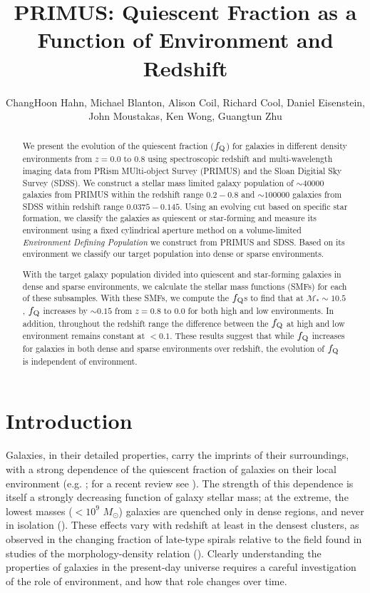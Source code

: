 \documentclass{emulateapj}
\begin{document}
\title{PRIMUS: Quiescent Fraction as a Function of Environment and Redshift}
\author{ChangHoon Hahn, Michael Blanton, Alison Coil, Richard Cool, Daniel Eisenstein, John Moustakas, Ken Wong, Guangtun Zhu}

\begin{abstract}
We present the evolution of the quiescent fraction ($f_{\rm{Q}}$) for galaxies in 
different density environments from $z=0.0$ to $0.8$ using spectroscopic 
redshift and multi-wavelength imaging data from PRism MUlti-object 
Survey (PRIMUS) and the Sloan Digitial Sky Survey (SDSS). We construct 
a stellar mass limited galaxy population of 
$\sim 40000$ galaxies from PRIMUS within the redshift range $0.2-0.8$ and $\sim 100000$
galaxies from SDSS within redshift range $0.0375-0.145$. Using an evolving cut based on
specific star formation, we classify the galaxies as quiescent or star-forming and
measure its environment using a fixed cylindrical aperture method 
on a volume-limited {\em Environment Defining Population} we construct 
from PRIMUS and SDSS. Based on its environment we classify our target
population into dense or sparse environments.   

With the target galaxy population divided into quiescent and star-forming galaxies 
in dense and sparse environments, we calculate the stellar mass functions 
(SMFs) for each of these subsamples. %
With these SMFs, we compute the $f_{\rm{Q}}$s to find that at 
$\mathcal{M}_{*} \sim 10.5$, $f_{\rm{Q}}$ increases by $\sim 0.15$ from 
$z=0.8$ to $0.0$ for both high and low environments. 
In addition, throughout the redshift range the difference between the
$f_{\rm{Q}}$ at high and low environment remains constant at $< 0.1$. 
These results suggest that while $f_{\rm{Q}}$ increases for galaxies in 
both dense and sparse environments over redshift, the evolution of $f_{\rm{Q}}$ 
is independent of environment. 
\end{abstract}

\section{Introduction}
Galaxies, in their detailed properties, carry the imprints of their
surroundings, with a strong dependence of the quiescent fraction of
galaxies on their local environment (e.g. \citealt{hubble36a,
oemler74a, dressler80a, hermit96a, guzzo97a}; for a recent review see
\citealt{blanton09a}).  The strength of this dependence is itself a
strongly decreasing function of galaxy stellar mass; at the extreme,
the lowest masses ($<10^{9}$ $M_\odot$) galaxies are quenched only in
dense regions, and never in isolation (\citealt{geha12a}).  These
effects vary with redshift at least in the densest clusters, as
observed in the changing fraction of late-type spirals relative to the
field found in studies of the morphology-density relation
(\citealt{dressler84a, desai07a}).  Clearly understanding the
properties of galaxies in the present-day universe requires a careful
investigation of the role of environment, and how that role changes
over time.
\end{document}
